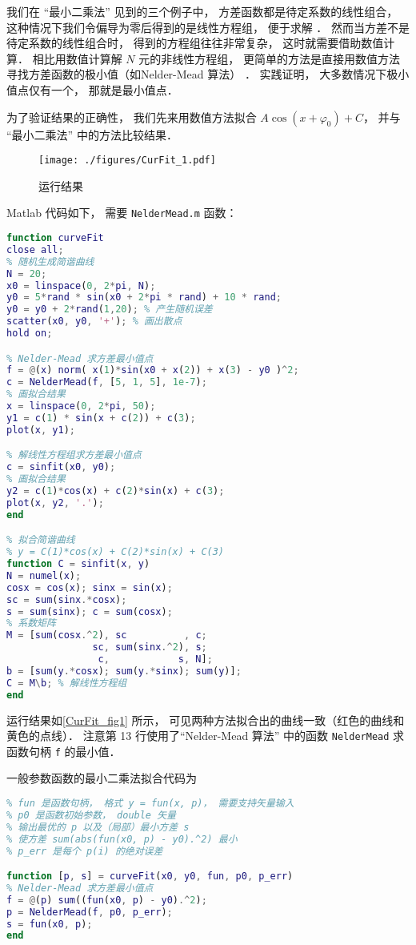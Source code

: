 
我们在 “最小二乘法” 见到的三个例子中， 方差函数都是待定系数的线性组合， 这种情况下我们令偏导为零后得到的是线性方程组， 便于求解 %
． 然而当方差不是待定系数的线性组合时， 得到的方程组往往非常复杂， 这时就需要借助数值计算． 相比用数值计算解 $N$ 元的非线性方程组， 更简单的方法是直接用数值方法寻找方差函数的极小值（如Nelder-Mead 算法） ． 实践证明， 大多数情况下极小值点仅有一个， 那就是最小值点．

为了验证结果的正确性， 我们先来用数值方法拟合 $A\cos (x + \varphi_0) + C$， 并与 “最小二乘法” 中的方法比较结果．

\begin{figure}[ht]
\centering
\texttt{[image: ./figures/CurFit\_1.pdf]}
\caption{运行结果} \label{CurFit_fig1}
\end{figure}

Matlab 代码如下， 需要 \verb|NelderMead.m| 函数：
\begin{lstlisting}[language=matlab, caption=curveFit\_test.m]
function curveFit
close all;
% 随机生成简谐曲线
N = 20;
x0 = linspace(0, 2*pi, N);
y0 = 5*rand * sin(x0 + 2*pi * rand) + 10 * rand;
y0 = y0 + 2*rand(1,20); % 产生随机误差
scatter(x0, y0, '+'); % 画出散点
hold on;

% Nelder-Mead 求方差最小值点
f = @(x) norm( x(1)*sin(x0 + x(2)) + x(3) - y0 )^2;
c = NelderMead(f, [5, 1, 5], 1e-7);
% 画拟合结果
x = linspace(0, 2*pi, 50);
y1 = c(1) * sin(x + c(2)) + c(3);
plot(x, y1);

% 解线性方程组求方差最小值点
c = sinfit(x0, y0);
% 画拟合结果
y2 = c(1)*cos(x) + c(2)*sin(x) + c(3);
plot(x, y2, '.');
end

% 拟合简谐曲线
% y = C(1)*cos(x) + C(2)*sin(x) + C(3)
function C = sinfit(x, y)
N = numel(x);
cosx = cos(x); sinx = sin(x);
sc = sum(sinx.*cosx);
s = sum(sinx); c = sum(cosx);
% 系数矩阵
M = [sum(cosx.^2), sc          , c;
               sc, sum(sinx.^2), s;
                c,            s, N];
b = [sum(y.*cosx); sum(y.*sinx); sum(y)];
C = M\b; % 解线性方程组
end
\end{lstlisting}

运行结果如\autoref{CurFit_fig1} 所示， 可见两种方法拟合出的曲线一致（红色的曲线和黄色的点线）． 注意第 13 行使用了“Nelder-Mead 算法” 中的函数 \verb|NelderMead| 求函数句柄 \verb|f| 的最小值．

一般参数函数的最小二乘法拟合代码为
\begin{lstlisting}[language=matlab, caption=curveFit.m]
% 最小二乘法拟合一元实函数，(x0,y0) 是数据点
% fun 是函数句柄， 格式 y = fun(x, p)， 需要支持矢量输入
% p0 是函数初始参数， double 矢量
% 输出最优的 p 以及（局部）最小方差 s
% 使方差 sum(abs(fun(x0, p) - y0).^2) 最小
% p_err 是每个 p(i) 的绝对误差

function [p, s] = curveFit(x0, y0, fun, p0, p_err)
% Nelder-Mead 求方差最小值点
f = @(p) sum((fun(x0, p) - y0).^2);
p = NelderMead(f, p0, p_err);
s = fun(x0, p);
end
\end{lstlisting}
